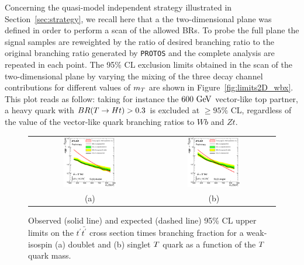 Concerning the quasi-model independent strategy illustrated in Section~\ref{sec:strategy}, 
we recall here that a the two-dimensional plane was defined in order
to perform a scan of the allowed BRs.
To probe the full plane the signal samples are reweighted by the ratio
of desired branching ratio to the original branching ratio generated
by \texttt{PROTOS} and the complete analysis are repeated in each point.
The  95\% CL exclusion limits  obtained in the scan of the two-dimensional
plane by varying the mixing of the three decay channel contributions for
different values of $m_{\T}$ are shown in Figure~\ref{fig:limits2D_wbx}. 
This plot reads as follow: taking for instance the $600\gev$ 
vector-like top partner, a heavy quark with
$BR(\T\to Ht)>0.3$ is excluded at $\geq 95\%$ CL,
regardless of the value of the vector-like quark branching ratios to $Wb$ and $Zt$.  



\begin{figure}[htbp]
\begin{center}
\begin{tabular}{cc}
\includegraphics[width=0.45\textwidth]{results/figures/htx/lim_doublet.eps} &
\includegraphics[width=0.45\textwidth]{results/figures/htx/lim_singlet.eps} \\
(a) & (b) \\
\end{tabular}
\caption{Observed (solid line) and expected (dashed line) 95\% CL upper limits on the $t^\prime \bar{t^\prime}$ cross section times branching fraction
for a weak-isospin (a) doublet and (b) singlet $\T$ quark  as a function of the $\T$ quark mass. 
\label{fig:limits1D_htx}}
\end{center}
\end{figure}

